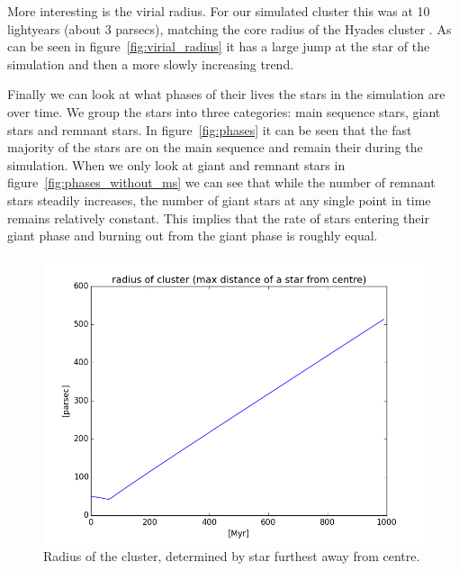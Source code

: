 \documentclass{aa}
\begin{document}
More interesting is the virial radius. For our simulated cluster this was at 10 lightyears (about 3 parsecs), matching the core radius of the Hyades cluster \citep{2009AIPC.1094..497B}. As can be seen in figure~\ref{fig:virial_radius} it has a large jump at the star of the simulation and then a more slowly increasing trend.

Finally we can look at what phases of their lives the stars in the simulation are over time. We group the stars into three categories: main sequence stars, giant stars and remnant stars. In figure~\ref{fig:phases} it can be seen that the fast majority of the stars are on the main sequence and remain their during the simulation. When we only look at giant and remnant stars in figure~\ref{fig:phases_without_ms} we can see that while the number of remnant stars steadily increases, the number of giant stars at any single point in time remains relatively constant. This implies that the rate of stars entering their giant phase and burning out from the giant phase is roughly equal.
\begin{figure}
    \centering
    \includegraphics[width=\hsize]{img/cluster_max_radius.png}
    \caption{Radius of the cluster, determined by star furthest away from centre.}\label{fig:max_radius}
\end{figure}
\end{document}
